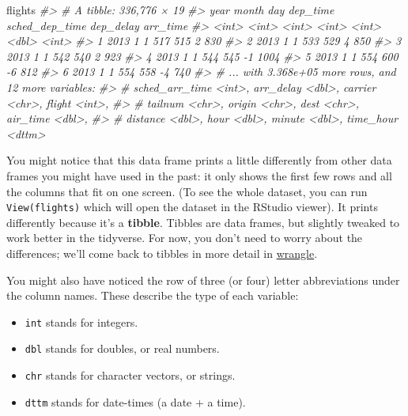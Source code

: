 \documentclass[]{book}
\newenvironment{Shaded}{\begin{snugshade}}{\end{snugshade}}
\newcommand{\CommentTok}[1]{\textcolor[rgb]{0.56,0.35,0.01}{\textit{{#1}}}}
\newcommand{\NormalTok}[1]{{#1}}
\begin{document}
\begin{Shaded}
\begin{Highlighting}[]
\NormalTok{flights}
\CommentTok{#> # A tibble: 336,776 × 19}
\CommentTok{#>    year month   day dep_time sched_dep_time dep_delay arr_time}
\CommentTok{#>   <int> <int> <int>    <int>          <int>     <dbl>    <int>}
\CommentTok{#> 1  2013     1     1      517            515         2      830}
\CommentTok{#> 2  2013     1     1      533            529         4      850}
\CommentTok{#> 3  2013     1     1      542            540         2      923}
\CommentTok{#> 4  2013     1     1      544            545        -1     1004}
\CommentTok{#> 5  2013     1     1      554            600        -6      812}
\CommentTok{#> 6  2013     1     1      554            558        -4      740}
\CommentTok{#> # ... with 3.368e+05 more rows, and 12 more variables:}
\CommentTok{#> #   sched_arr_time <int>, arr_delay <dbl>, carrier <chr>, flight <int>,}
\CommentTok{#> #   tailnum <chr>, origin <chr>, dest <chr>, air_time <dbl>,}
\CommentTok{#> #   distance <dbl>, hour <dbl>, minute <dbl>, time_hour <dttm>}
\end{Highlighting}
\end{Shaded}

You might notice that this data frame prints a little differently from
other data frames you might have used in the past: it only shows the
first few rows and all the columns that fit on one screen. (To see the
whole dataset, you can run \texttt{View(flights)} which will open the
dataset in the RStudio viewer). It prints differently because it's a
\textbf{tibble}. Tibbles are data frames, but slightly tweaked to work
better in the tidyverse. For now, you don't need to worry about the
differences; we'll come back to tibbles in more detail in
\protect\hyperlink{wrangle-intro}{wrangle}.

You might also have noticed the row of three (or four) letter
abbreviations under the column names. These describe the type of each
variable:

\begin{itemize}
\item
  \texttt{int} stands for integers.
\item
  \texttt{dbl} stands for doubles, or real numbers.
\item
  \texttt{chr} stands for character vectors, or strings.
\item
  \texttt{dttm} stands for date-times (a date + a time).
\end{itemize}
\end{document}
